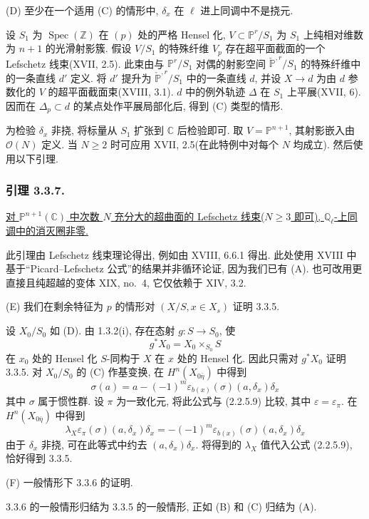 \par\medskip
\noindent\textup{(D)}
至少在一个适用 (C) 的情形中, $\delta_x$ 在 $\ell$ 进上同调中不是挠元.

设 $S_1$ 为 $\operatorname{Spec}(\mathbb Z)$ 在 $(p)$ 处的严格 Hensel 化, $V\subset\mathbb P^r/S_1$ 为 $S_1$ 上纯相对维数为 $n+1$ 的光滑射影簇. 假设 $V/S_1$ 的特殊纤维 $V_p$ 存在超平面截面的一个 Lefschetz 线束(XVII, 2.5). 此束由与 $\mathbb P^r/S_1$ 对偶的射影空间 $\check{\mathbb P}^{,r}/S_1$ 的特殊纤维中的一条直线 $d'$ 定义. 将 $d'$ 提升为 $\check{\mathbb P}^{,r}/S_1$ 中的一条直线 $d$, 并设 $X\to d$ 为由 $d$ 参数化的 $V$ 的超平面截面束(XVIII, 3.1). $d$ 中的例外轨迹 $\Delta$ 在 $S_1$ 上平展(XVII, 6). 因而在 $\Delta_p\subset d$ 的某点处作平展局部化后, 得到 (C) 类型的情形.

为检验 $\delta_x$ 非挠, 将标量从 $S_1$ 扩张到 $\mathbb C$ 后检验即可. 取 $V=\mathbb P^{n+1}$, 其射影嵌入由 $\mathcal O(N)$ 定义. 当 $N\ge2$ 时可应用 XVII, 2.5(在此特例中对每个 $N$ 均成立). 然后使用以下引理.

\subsubsection*{引理 3.3.7.}
\underline{对 $\mathbb P^{n+1}(\mathbb C)$ 中次数 $N$ 充分大的超曲面的 Lefschetz 线束($N\ge3$ 即可), $\mathbb Q_\ell$-上同调中的消灭圈非零.}

此引理由 Lefschetz 线束理论得出, 例如由 XVIII, 6.6.1 得出. 此处使用 XVIII 中基于“Picard--Lefschetz 公式”的结果并非循环论证, 因为我们已有 (A). 也可改用更直接且纯超越的变体 XIX, no.~4, 它仅依赖于 XIV, 3.2.

\medskip
\noindent\textup{(E)}
我们在剩余特征为 $p$ 的情形对 $(X/S,x\in X_s)$ 证明 3.3.5.

设 $X_0/S_0$ 如 (D). 由 1.3.2(i), 存在态射 $g:S\to S_0$, 使
\[
g^*X_0=X_0\times_{S_0}S
\]
在 $x_0$ 处的 Hensel 化 $S$-同构于 $X$ 在 $x$ 处的 Hensel 化. 因此只需对 $g^*X_0$ 证明 3.3.5. 对 $X_0/S_0$ 的 (C) 作基变换, 在 $H^n(X_{0\bar\eta})$ 中得到
\[
\sigma(a)=a-(-1)^m
\varepsilon_{b(x)}(\sigma)(a,\delta_x)\delta_x
\]
其中 $\sigma$ 属于惯性群. 设 $\pi$ 为一致化元, 将此公式与 (2.2.5.9) 比较, 其中 $\varepsilon=\varepsilon_\pi$. 在 $H^n(X_{0\bar\eta})$ 中得到
\[
\lambda_X\varepsilon_\pi(\sigma)(a,\delta_x)\delta_x
=-(-1)^m\varepsilon_{b(x)}(\sigma)(a,\delta_x)\delta_x
\]
由于 $\delta_x$ 非挠, 可在此等式中约去 $(a,\delta_x)\delta_x$. 将得到的 $\lambda_X$ 值代入公式 (2.2.5.9), 恰好得到 3.3.5.

\medskip
\noindent\textup{(F) 一般情形下 3.3.6 的证明.}

3.3.6 的一般情形归结为 3.3.5 的一般情形, 正如 (B) 和 (C) 归结为 (A).